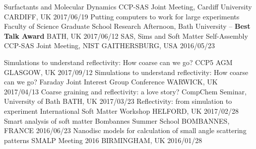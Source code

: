 \begin{cvhonors}
  \cvhonor
    {Surfactants and Molecular Dynamics}
    {CCP-SAS Joint Meeting, Cardiff University}
    {CARDIFF, UK}
    {2017/06/19}
  \cvhonor
  	{Putting computers to work for large experiments}
    {Faculty of Science Graduate School Research Afternoon, Bath University -- \textbf{Best Talk Award}}
    {BATH, UK}
    {2017/06/12}
  \cvhonor
    {SAS, Sims and Soft Matter Self-Assembly}
    {CCP-SAS Joint Meeting, NIST}
    {GAITHERSBURG, USA}
    {2016/05/23}
\end{cvhonors}

\begin{cvhonors}
  \cvhonor
    {Simulations to understand reflectivity: How coarse can we go?}
    {CCP5 AGM}
    {GLASGOW, UK}
    {2017/09/12}
  \cvhonor
  	{Simulations to understand reflectivity: How coarse can we go?}
    {Faraday Joint Interest Group Conference}
    {WARWICK, UK}
    {2017/04/13}
  \cvhonor
  	{Coarse graining and reflectivity: a love story?}
    {CompChem Seminar, University of Bath}
    {BATH, UK}
    {2017/03/23}
  \cvhonor
  	{Reflectivity: from simulation to experiment}
    {International Soft Matter Workshop}
    {HELFORD, UK}
    {2017/02/28}
  \cvhonor
    {Smart analysis of soft matter}
    {Bombannes Summer School}
    {BOMBANNES, FRANCE}
    {2016/06/23}
  \cvhonor
    {Nanodisc models for calculation of small angle scattering patterns}
    {SMALP Meeting 2016}
    {BIRMINGHAM, UK}
    {2016/01/28}
\end{cvhonors}

